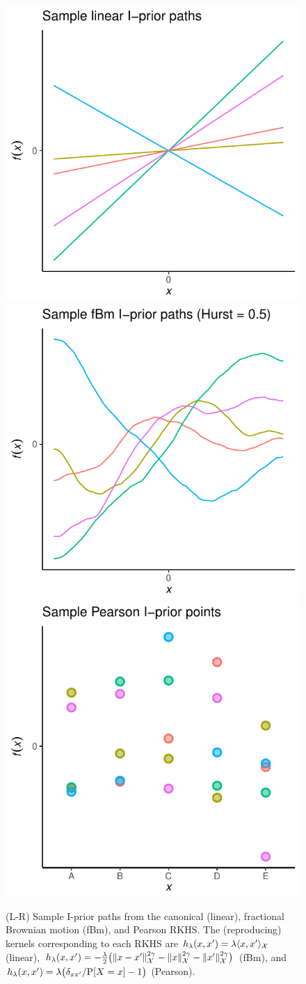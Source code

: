 \documentclass{beamer}
\newlength{\onecolwid}
\newlength{\twocolwid}
\newlength{\threecolwid}
\begin{document}
\begin{frame}[t]
\begin{columns}[t]
\begin{column}{\threecolwid}
\begin{columns}[t,totalwidth=\threecolwid]
\begin{columns}[t,totalwidth=\twocolwid]
\begin{column}{\twocolwid}
\begin{figure}
\includegraphics[width=0.33\linewidth]{figure/kernel_path_canonical}
\includegraphics[width=0.33\linewidth]{figure/kernel_path_fbm}
\includegraphics[width=0.33\linewidth]{figure/kernel_path_pearson}
\vspace{-40pt}
\caption{(L-R) Sample I-prior paths from the canonical (linear), fractional Brownian motion (fBm), and Pearson RKHS. The (reproducing) kernels corresponding to each RKHS are $h_\lambda(x,x') = \lambda  \langle x,x' \rangle_{\mathcal X}$ (linear), $h_\lambda(x,x') = -\frac{\lambda}{2} \big( \lVert x-x'\rVert_{\mathcal X}^{2\gamma} - \lVert x\rVert_{\mathcal X}^{2\gamma} - \lVert x'\rVert_{\mathcal X}^{2\gamma}\big)$ (fBm), and $h_\lambda(x,x') = \lambda \big( {\delta_{xx'}} / {\operatorname{P}[X=x]} - 1 \big)$ (Pearson).}
\end{figure}

\begin{columns}[t,totalwidth=\twocolwid]  %
\begin{column}{\onecolwid}


\end{column}
\end{columns}
\end{column}
\end{columns}
\end{columns}
\end{column}
\end{columns}
\end{frame}
\end{document}
